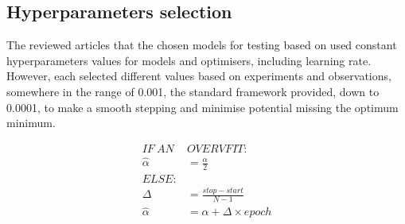 \subsection{Hyperparameters selection} \label{subsec:l-rate}
%
The reviewed articles that the chosen models for testing based on used constant hyperparameters values for models and optimisers, including learning rate.
However, each selected different values based on experiments and observations, somewhere in the range of 0.001, the standard framework provided, down to 0.0001, to make a smooth stepping and minimise potential missing the optimum minimum.

%
\begin{equation}
  \begin{split}
      IF \ AN \ & OVERVFIT: \\
      \hat{\alpha} &= \frac{\alpha }{2} \\
      ELSE: & \\
      \Delta &= \frac{stop - start}{N-1} \\
      \hat{\alpha} &= \alpha + \Delta \times epoch \\
      \label{eq:scheduler}
  \end{split}
\end{equation}
